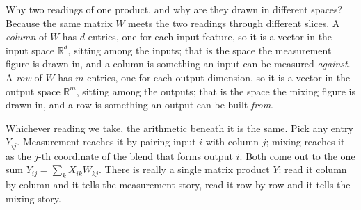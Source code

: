 \documentclass[11pt]{article}
\newcommand{\meas}[1]{\textcolor{measink}{#1}}
\newcommand{\mix}[1]{\textcolor{mixink}{#1}}
\newcommand{\figcap}[1]{\par\vspace{0.35em}{\footnotesize\color{softgray}#1}\par}
\begin{document}
Why two readings of one product, and why are they drawn in different spaces? Because the same matrix $W$ meets the two readings through different slices. A \emph{column} of $W$ has $d$ entries, one for each input feature, so it is a vector in the input space $\mathbb{R}^{d}$, sitting among the inputs; that is the space the measurement figure is drawn in, and a column is something an input can be measured \emph{against}. A \emph{row} of $W$ has $m$ entries, one for each output dimension, so it is a vector in the output space $\mathbb{R}^{m}$, sitting among the outputs; that is the space the mixing figure is drawn in, and a row is something an output can be built \emph{from}.

Whichever reading we take, the arithmetic beneath it is the same. Pick any entry $Y_{ij}$. Measurement reaches it by pairing input $i$ with column $j$; mixing reaches it as the $j$-th coordinate of the blend that forms output $i$. Both come out to the one sum $Y_{ij}=\sum_{k}X_{ik}W_{kj}$. There is really a single matrix product $Y$: read it column by column and it tells the measurement story, read it row by row and it tells the mixing story.

\end{document}
